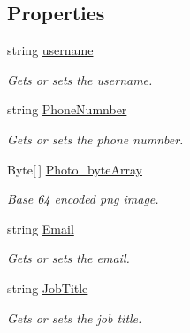 \subsection*{Properties}
\begin{DoxyCompactItemize}
\item 
string \hyperlink{class_open_1_1_g_i_1_1hypermart_1_1_data_transformation_objects_1_1_user_d_t_o_a123512619de906f987a3da0b7ec32bb1}{username}
\begin{DoxyCompactList}\small\item\em Gets or sets the username. \end{DoxyCompactList}\item 
string \hyperlink{class_open_1_1_g_i_1_1hypermart_1_1_data_transformation_objects_1_1_user_d_t_o_a8ead06f70fbd3e0bcc72bf3aaae4fc9f}{Phone\+Numnber}
\begin{DoxyCompactList}\small\item\em Gets or sets the phone numnber. \end{DoxyCompactList}\item 
Byte\mbox{[}$\,$\mbox{]} \hyperlink{class_open_1_1_g_i_1_1hypermart_1_1_data_transformation_objects_1_1_user_d_t_o_a3e4447b4cd2ef861c95c1e9162cbceb1}{Photo\+\_\+byte\+Array}
\begin{DoxyCompactList}\small\item\em Base 64 encoded png image. \end{DoxyCompactList}\item 
string \hyperlink{class_open_1_1_g_i_1_1hypermart_1_1_data_transformation_objects_1_1_user_d_t_o_a96fdfcc9b2aa36fb35f6612b9e99b535}{Email}
\begin{DoxyCompactList}\small\item\em Gets or sets the email. \end{DoxyCompactList}\item 
string \hyperlink{class_open_1_1_g_i_1_1hypermart_1_1_data_transformation_objects_1_1_user_d_t_o_a7a436dea35ee6683f2f7f0c3e9551d08}{Job\+Title}
\begin{DoxyCompactList}\small\item\em Gets or sets the job title. \end{DoxyCompactList}\end{DoxyCompactItemize}


